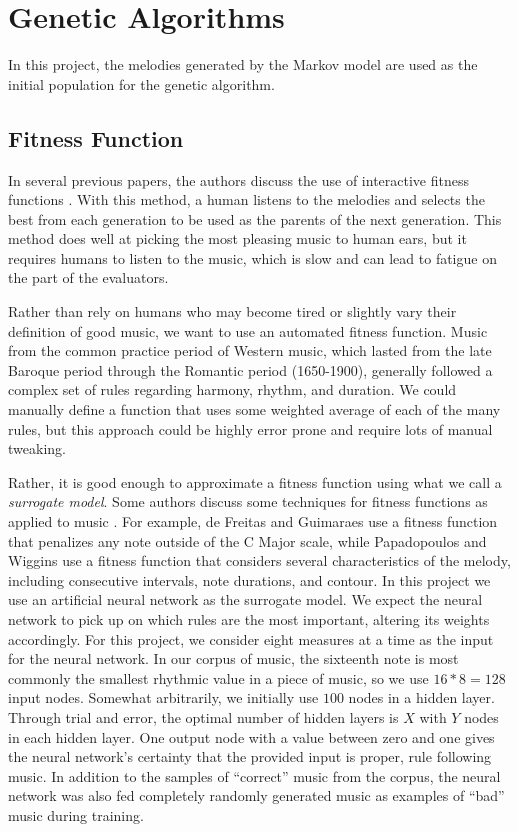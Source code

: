 \chapter{Genetic Algorithms} \label{ga}

In this project, the melodies generated by the Markov model are used as the initial population for the genetic algorithm.

\section{Fitness Function} \label{ga:fitness}

In several previous papers, the authors discuss the use of interactive fitness functions \cite{papadopoulos_ai_1999, mcvicar_autoguitartab:_2015}.
With this method, a human listens to the melodies and selects the best from each generation to be used as the parents of the next generation.
This method does well at picking the most pleasing music to human ears, but it requires humans to listen to the music, which is slow and can lead to fatigue on the part of the evaluators.

Rather than rely on humans who may become tired or slightly vary their definition of good music, we want to use an automated fitness function.
Music from the common practice period of Western music, which lasted from the late Baroque period through the Romantic period (1650-1900), generally followed a complex set of rules regarding harmony, rhythm, and duration.
We could manually define a function that uses some weighted average of each of the many rules, but this approach could be highly error prone and require lots of manual tweaking.

Rather, it is good enough to approximate a fitness function using what we call a \textit{surrogate model}. %
Some authors discuss some techniques for fitness functions as applied to music \cite{papadopoulos_ai_1999, de_freitas_originality_2011, alfonseca_fitness_2006}.
For example, de Freitas and Guimaraes use a fitness function that penalizes any note outside of the C Major scale, while Papadopoulos and Wiggins use a fitness function that considers several characteristics of the melody, including consecutive intervals, note durations, and contour.
In this project we use an artificial neural network as the surrogate model.
We expect the neural network to pick up on which rules are the most important, altering its weights accordingly.
For this project, we consider eight measures at a time as the input for the neural network.
In our corpus of music, the sixteenth note is most commonly the smallest rhythmic value in a piece of music, so we use $16 * 8 = 128$ input nodes.
Somewhat arbitrarily, we initially use $100$ nodes in a hidden layer.
Through trial and error, the optimal number of hidden layers is $X$ with $Y$ nodes in each hidden layer. %
One output node with a value between zero and one gives the neural network's certainty that the provided input is proper, rule following music.
In addition to the samples of ``correct'' music from the corpus, the neural network was also fed completely randomly generated music as examples of ``bad'' music during training.

